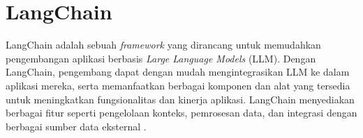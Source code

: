 \section{LangChain}
\label{sec:langchain}

LangChain adalah sebuah \textit{framework} yang dirancang untuk memudahkan pengembangan aplikasi berbasis \textit{Large Language Models} (LLM). Dengan LangChain, pengembang dapat dengan mudah mengintegrasikan LLM ke dalam aplikasi mereka, serta memanfaatkan berbagai komponen dan alat yang tersedia untuk meningkatkan fungsionalitas dan kinerja aplikasi. LangChain menyediakan berbagai fitur seperti pengelolaan konteks, pemrosesan data, dan integrasi dengan berbagai sumber data eksternal \parencite{IBM2023LangChain}.





